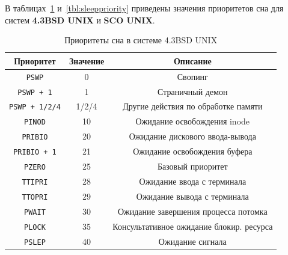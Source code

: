 \documentclass[a4paper, 12pt]{extreport}
\begin{document}
В таблицах~\ref{tab:bsd} и~\ref{tbl:sleeppriority} приведены значения приоритетов сна для систем \textbf{4.3BSD UNIX} и \textbf{SCO UNIX}.

\begin{table}[h]
	\caption{Приоритеты сна в системе 4.3BSD UNIX}
	\label{tab:bsd}
	\begin{center}
		\begin{tabular}{ |c|c|c|  }
			\hline
			\textbf{Приоритет} & \textbf{Значение} & \textbf{Описание} \\
			\hline
			\texttt{PSWP} & 0 & Свопинг \\
			\hline
			\texttt{PSWP + 1} & 1 & Страничный демон \\
			\hline
			\texttt{PSWP + 1/2/4} & 1/2/4 & Другие действия по обработке памяти \\
			\hline
			\texttt{PINOD} & 10 & Ожидание освобождения inode \\
			\hline
			\texttt{PRIBIO} & 20 & Ожидание дискового ввода-вывода \\
			\hline
			\texttt{PRIBIO + 1} & 21 & Ожидание освобождения буфера \\
			\hline
			\texttt{PZERO} & 25 & Базовый приоритет \\
			\hline
			\texttt{TTIPRI} & 28 & Ожидание ввода с терминала \\
			\hline
			\texttt{TTOPRI} & 29 & Ожидание вывода с терминала \\
			\hline 
			\texttt{PWAIT} & 30 & Ожидание завершения процесса потомка \\
			\hline
			\texttt{PLOCK} & 35 & Консультативное ожидание блокир. ресурса \\
			\hline
			\texttt{PSLEP} & 40 & Ожидание сигнала \\
			\hline
		\end{tabular}
	\end{center}
\end{table}
\end{document}

